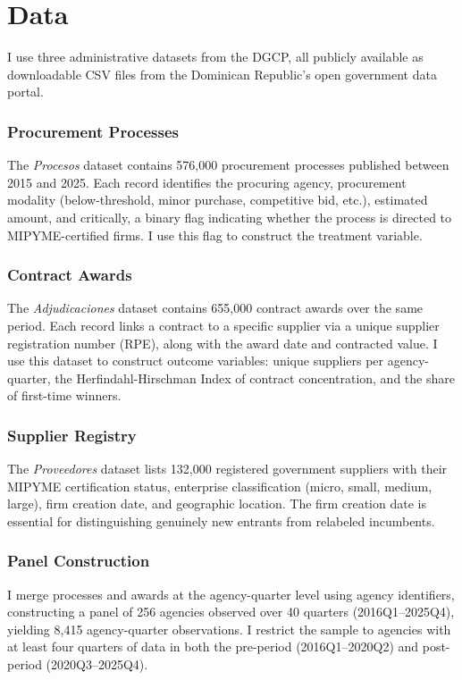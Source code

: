 \documentclass[12pt]{article}
\begin{document}
\section{Data}

I use three administrative datasets from the DGCP, all publicly available as downloadable CSV files from the Dominican Republic's open government data portal.

\subsubsection*{Procurement Processes} The \textit{Procesos} dataset contains 576,000 procurement processes published between 2015 and 2025. Each record identifies the procuring agency, procurement modality (below-threshold, minor purchase, competitive bid, etc.), estimated amount, and critically, a binary flag indicating whether the process is directed to MIPYME-certified firms. I use this flag to construct the treatment variable.

\subsubsection*{Contract Awards} The \textit{Adjudicaciones} dataset contains 655,000 contract awards over the same period. Each record links a contract to a specific supplier via a unique supplier registration number (RPE), along with the award date and contracted value. I use this dataset to construct outcome variables: unique suppliers per agency-quarter, the Herfindahl-Hirschman Index of contract concentration, and the share of first-time winners.

\subsubsection*{Supplier Registry} The \textit{Proveedores} dataset lists 132,000 registered government suppliers with their MIPYME certification status, enterprise classification (micro, small, medium, large), firm creation date, and geographic location. The firm creation date is essential for distinguishing genuinely new entrants from relabeled incumbents.

\subsubsection*{Panel Construction} I merge processes and awards at the agency-quarter level using agency identifiers, constructing a panel of 256 agencies observed over 40 quarters (2016Q1--2025Q4), yielding 8,415 agency-quarter observations. I restrict the sample to agencies with at least four quarters of data in both the pre-period (2016Q1--2020Q2) and post-period (2020Q3--2025Q4).
\end{document}
